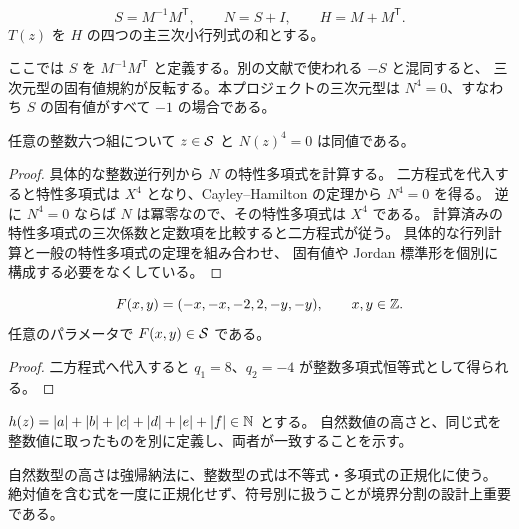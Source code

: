 \begin{definition}\label{bp:def-serre}
\leanok
{}
\[
S=M^{-1}M^{\mathsf T},\qquad N=S+I,\qquad H=M+M^{\mathsf T}.
\]
$T(z)$ を $H$ の四つの主三次小行列式の和とする。
\end{definition}
ここでは $S$ を $M^{-1}M^{\mathsf T}$ と定義する。別の文献で使われる $-S$ と混同すると、
三次元型の固有値規約が反転する。本プロジェクトの三次元型は $N^4=0$、すなわち $S$ の固有値がすべて $-1$ の場合である。

\begin{theorem}[二方程式と四乗零の同値]\label{bp:matrix-nilpotent}
\leanok
{}
任意の整数六つ組について $z\in\mathcal S$ と $N(z)^4=0$ は同値である。
\end{theorem}
\begin{proof}\leanok{}
具体的な整数逆行列から $N$ の特性多項式を計算する。
二方程式を代入すると特性多項式は $X^4$ となり、Cayley--Hamilton の定理から $N^4=0$ を得る。
逆に $N^4=0$ ならば $N$ は冪零なので、その特性多項式は $X^4$ である。
計算済みの特性多項式の三次係数と定数項を比較すると二方程式が従う。
具体的な行列計算と一般の特性多項式の定理を組み合わせ、
固有値や Jordan 標準形を個別に構成する必要をなくしている。
\end{proof}

\begin{definition}[基本族]\label{bp:def-family}
\leanok
{}
\[
F(x,y)=(-x,-x,-2,2,-y,-y),\qquad x,y\in\mathbb Z.
\]
任意のパラメータで $F(x,y)\in\mathcal S$ である。
\end{definition}
\begin{proof}\leanok{}
二方程式へ代入すると $q_1=8$、$q_2=-4$ が整数多項式恒等式として得られる。
\end{proof}
\begin{definition}[整数下降に用いる高さ]\label{bp:def-height}
\leanok
{}
$h(z)=|a|+|b|+|c|+|d|+|e|+|f|\in\mathbb N$ とする。
自然数値の高さと、同じ式を整数値に取ったものを別に定義し、両者が一致することを示す。
\end{definition}
自然数型の高さは強帰納法に、整数型の式は不等式・多項式の正規化に使う。
絶対値を含む式を一度に正規化せず、符号別に扱うことが境界分割の設計上重要である。

